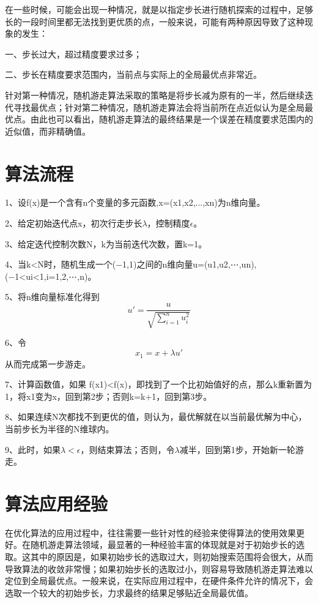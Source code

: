 \documentclass{ctexart}
\begin{document}
在一些时候，可能会出现一种情况，就是以指定步长进行随机探索的过程中，足够长的一段时间里都无法找到更优质的点，一般来说，可能有两种原因导致了这种现象的发生：

一、步长过大，超过精度要求过多；

二、步长在精度要求范围内，当前点与实际上的全局最优点非常近。

针对第一种情况，随机游走算法采取的策略是将步长减为原有的一半，然后继续迭代寻找最优点；针对第二种情况，随机游走算法会将当前所在点近似认为是全局最优点。由此也可以看出，随机游走算法的最终结果是一个误差在精度要求范围内的近似值，而非精确值。

\section{算法流程}
1、设f(x)是一个含有n个变量的多元函数,x=(x1,x2,...,xn)为n维向量。

2、给定初始迭代点x，初次行走步长$\lambda$，控制精度$\epsilon$。

3、给定迭代控制次数N，k为当前迭代次数，置k=1。

4、当k<N时，随机生成一个(−1,1)之间的n维向量u=(u1,u2,⋯,un),(−1<ui<1,i=1,2,⋯,n)。

5、将n维向量标准化得到
		\begin{equation} 
        \label{eqn15} 
        u' =\frac{u}{\sqrt{\sum_{i=1}^nu_{i}^2}}
        \end{equation}

6、令
		\begin{equation} 
        \label{eqn16} 
		x_1 =x + \lambda u'
		\end{equation}从而完成第一步游走。

7、计算函数值，如果 f(x1)<f(x)，即找到了一个比初始值好的点，那么k重新置为1，将x1变为x，回到第2步；否则k=k+1，回到第3步。

8、如果连续N次都找不到更优的值，则认为，最优解就在以当前最优解为中心，当前步长为半径的N维球内。

9、此时，如果$\lambda<\epsilon$，则结束算法；否则，令$\lambda$减半，回到第1步，开始新一轮游走。

\section{算法应用经验}
在优化算法的应用过程中，往往需要一些针对性的经验来使得算法的使用效果更好。在随机游走算法领域，最显著的一种经验丰富的体现就是对于初始步长的选取。这其中的原因是，如果初始步长的选取过大，则初始搜索范围将会很大，从而导致算法的收敛非常慢；如果初始步长的选取过小，则容易导致随机游走算法难以定位到全局最优点。一般来说，在实际应用过程中，在硬件条件允许的情况下，会选取一个较大的初始步长，力求最终的结果足够贴近全局最优值。
\end{document}
